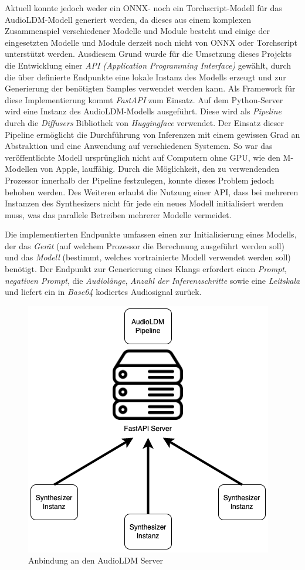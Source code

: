 \documentclass[
  a4paper,  %
  twoside,  %
  bibliography=totoc,
  headsepline,
  cleardoublepage=empty,
  parskip=half,
  draft=false
]{scrbook}
\begin{document}
Aktuell konnte jedoch weder ein ONNX- noch ein Torchscript-Modell für das AudioLDM-Modell generiert werden, da dieses aus einem komplexen Zusammenspiel verschiedener Modelle und Module besteht und einige der eingesetzten Modelle und Module derzeit noch nicht von ONNX oder Torchscript unterstützt werden. Ausdiesem Grund wurde für die Umsetzung dieses Projekts die Entwicklung einer \emph{API (Application Programming Interface)} gewählt, durch die über definierte Endpunkte eine lokale Instanz des Modells erzeugt und zur Generierung der benötigten Samples verwendet werden kann. Als Framework für diese Implementierung kommt \emph{FastAPI} \cite{noauthor_fastapi_nodate} zum Einsatz. Auf dem Python-Server wird eine Instanz des AudioLDM-Modells ausgeführt. Diese wird als \emph{Pipeline} durch die \emph{Diffusers} Bibliothek von \emph{Huggingface} \cite{noauthor_huggingface_nodate} verwendet. Der Einsatz dieser Pipeline ermöglicht die Durchführung von Inferenzen mit einem gewissen Grad an Abstraktion und eine Anwendung auf verschiedenen Systemen. So war das veröffentlichte Modell ursprünglich nicht auf Computern ohne GPU, wie den M-Modellen von Apple, lauffähig. Durch die Möglichkeit, den zu verwendenden Prozessor innerhalb der Pipeline festzulegen, konnte dieses Problem jedoch behoben werden. Des Weiteren erlaubt die Nutzung einer API, dass bei mehreren Instanzen des Synthesizers nicht für jede ein neues Modell initialisiert werden muss, was das parallele Betreiben mehrerer Modelle vermeidet.

Die implementierten Endpunkte umfassen einen zur Initialisierung eines Modells, der das \emph{Gerät} (auf welchem Prozessor die Berechnung ausgeführt werden soll) und das \emph{Modell} (bestimmt, welches vortrainierte Modell verwendet werden soll) benötigt. Der Endpunkt zur Generierung eines Klangs erfordert einen \emph{Prompt}, \emph{negativen Prompt}, die \emph{Audiolänge}, \emph{Anzahl der Inferenzschritte} sowie eine \emph{Leitskala} und liefert ein in \emph{Base64} kodiertes Audiosignal zurück.

\begin{figure}
  \centering
  \includegraphics[width=.4\textwidth]{graphics/Server.png}
  \caption[Infrastruktur]{Anbindung an den AudioLDM Server}
  \label{fig:server}
\end{figure}
\end{document}
